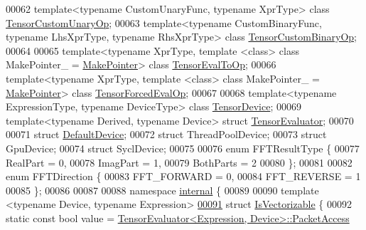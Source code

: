 \begin{DoxyCode}
00062 \textcolor{keyword}{template}<\textcolor{keyword}{typename} CustomUnaryFunc, \textcolor{keyword}{typename} XprType> \textcolor{keyword}{class }\hyperlink{class_eigen_1_1_tensor_custom_unary_op}{TensorCustomUnaryOp};
00063 \textcolor{keyword}{template}<\textcolor{keyword}{typename} CustomBinaryFunc, \textcolor{keyword}{typename} LhsXprType, \textcolor{keyword}{typename} RhsXprType> \textcolor{keyword}{class }
      \hyperlink{class_eigen_1_1_tensor_custom_binary_op}{TensorCustomBinaryOp};
00064 
00065 \textcolor{keyword}{template}<\textcolor{keyword}{typename} XprType, \textcolor{keyword}{template} <\textcolor{keyword}{class}> \textcolor{keyword}{class }MakePointer\_ = \hyperlink{struct_eigen_1_1_make_pointer}{MakePointer}> \textcolor{keyword}{class }
      \hyperlink{class_eigen_1_1_tensor_eval_to_op}{TensorEvalToOp};
00066 \textcolor{keyword}{template}<\textcolor{keyword}{typename} XprType, \textcolor{keyword}{template} <\textcolor{keyword}{class}> \textcolor{keyword}{class }MakePointer\_ = \hyperlink{struct_eigen_1_1_make_pointer}{MakePointer}> \textcolor{keyword}{class }
      \hyperlink{class_eigen_1_1_tensor_forced_eval_op}{TensorForcedEvalOp};
00067 
00068 \textcolor{keyword}{template}<\textcolor{keyword}{typename} ExpressionType, \textcolor{keyword}{typename} DeviceType> \textcolor{keyword}{class }\hyperlink{class_eigen_1_1_tensor_device}{TensorDevice};
00069 \textcolor{keyword}{template}<\textcolor{keyword}{typename} Derived, \textcolor{keyword}{typename} Device> \textcolor{keyword}{struct }\hyperlink{struct_eigen_1_1_tensor_evaluator}{TensorEvaluator};
00070 
00071 \textcolor{keyword}{struct }\hyperlink{struct_eigen_1_1_default_device}{DefaultDevice};
00072 \textcolor{keyword}{struct }ThreadPoolDevice;
00073 \textcolor{keyword}{struct }GpuDevice;
00074 \textcolor{keyword}{struct }SyclDevice;
00075 
00076 \textcolor{keyword}{enum} FFTResultType \{
00077   RealPart = 0,
00078   ImagPart = 1,
00079   BothParts = 2
00080 \};
00081 
00082 \textcolor{keyword}{enum} FFTDirection \{
00083     FFT\_FORWARD = 0,
00084     FFT\_REVERSE = 1
00085 \};
00086 
00087 
00088 \textcolor{keyword}{namespace }\hyperlink{namespaceinternal}{internal} \{
00089 
00090 \textcolor{keyword}{template} <\textcolor{keyword}{typename} Device, \textcolor{keyword}{typename} Expression>
\hyperlink{struct_eigen_1_1internal_1_1_is_vectorizable}{00091} \textcolor{keyword}{struct }\hyperlink{struct_eigen_1_1internal_1_1_is_vectorizable}{IsVectorizable} \{
00092   \textcolor{keyword}{static} \textcolor{keyword}{const} \textcolor{keywordtype}{bool} value = \hyperlink{struct_eigen_1_1_tensor_evaluator}{TensorEvaluator<Expression, Device>::PacketAccess}

\end{DoxyCode}
